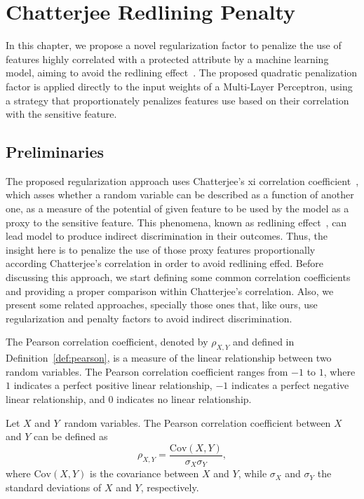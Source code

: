\chapter{Chatterjee Redlining Penalty}

In this chapter, we propose a novel regularization factor to penalize the use of features highly correlated with a protected attribute by a machine learning model, aiming to avoid the redlining effect~\citep{Pedreschi2008}. The proposed quadratic penalization factor is applied directly to the input weights of a Multi-Layer Perceptron, using a strategy that proportionately penalizes features use based on their correlation with the sensitive feature.

\section{Preliminaries}

The proposed regularization approach uses Chatterjee's xi correlation coefficient~\cite{chatterjee2020new}, which asses whether a random variable can be described as a function of another one, as a measure of the potential of given feature to be used by the model as a proxy to the sensitive feature. This phenomena, known as redlining effect~\citep{Pedreschi2008}, can lead model to produce indirect discrimination in their outcomes. Thus, the insight here is to penalize the use of those proxy features proportionally according Chatterjee's correlation in order to avoid redlining effed. Before discussing this approach, we start defining some common correlation coefficients and providing a proper comparison within Chatterjee's correlation. Also, we present some related approaches, specially those ones that, like ours, use regularization and penalty factors to avoid indirect discrimination.

The Pearson correlation coefficient, denoted by $\rho_{X,Y}$ and defined in Definition~\ref{def:pearson}, is a measure of the linear relationship between two random variables. The Pearson correlation coefficient ranges from $-1$ to $1$, where $1$ indicates a perfect positive linear relationship, $-1$ indicates a perfect negative linear relationship, and $0$ indicates no linear relationship.

\begin{definition}\label{def:pearson}
Let  $X$ and $Y$\ random variables. The Pearson correlation coefficient between $X$ and $Y$ can be defined as  
\begin{equation}
\rho_{X,Y} = \frac{\mathrm{Cov}(X, Y)}{\sigma_X \sigma_Y},
\end{equation}
where $\mathrm{Cov}(X, Y)$ is the covariance between $X$ and $Y$, while $\sigma_X$ and $\sigma_Y$ the standard deviations of $X$ and $Y$, respectively. 
\end{definition}


